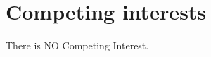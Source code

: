 \documentclass[unnumsec,webpdf,modern,large]{oup-authoring-template}
\theoremstyle{thmstyleone}%
\theoremstyle{thmstyletwo}%
\theoremstyle{thmstylethree}%
\begin{document}
\section{Competing interests}
There is NO Competing Interest.


%




%

\end{document}
